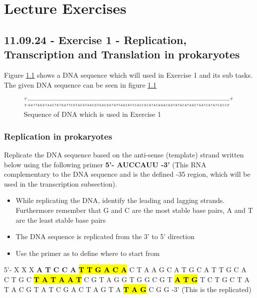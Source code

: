 \chapter{Lecture Exercises}

\section{11.09.24 - Exercise 1 - Replication, Transcription and Translation in prokaryotes}
Figure \ref*{fig:Exercise1Seq} shows a DNA sequence which will used in Exercise 1 and its sub tasks. The given DNA sequence can be seen in figure \ref{fig:Exercise1Seq}

\begin{figure}[h]
    \centering  
    \includegraphics[width=1\textwidth]{Figures/Exercise1Seq.png}
    \caption{Sequence of DNA which is used in Exercise 1}
    \label{fig:Exercise1Seq}
\end{figure}
\subsection{Replication in prokaryotes}
Replicate the DNA sequence based on the anti-sense (template) strand written below using the following primer \textbf{5’- AUCCAUU -3’} (This RNA complementary to the DNA sequence and is the defined -35 region, which will be used in the transcription subsection).

\vspace{1em}
\begin{itemize}
    \item While replicating the DNA, identify the leading and lagging strands. Furthermore remember that G and C are the most stable base pairs, A and T are the least stable base pairs
    \item The DNA sequence is replicated from the 3’ to 5’ direction
    \item Use the primer as to define where to start from
\end{itemize} 

\vspace{1em}

5'- X X X \textbf{A T C C A} \textbf{\hl{T T G A C A}} C T A A G C A T G C A T T G C A C T G C \hl{\textbf{T A T A A T}} C G T A G G T G G C G T \textbf{\hl{A T G}} T C T G C T A T A C G T A T C G A C T A G T A \textbf{\hl{T A G}} C G G -3'      (This is the replicated)

